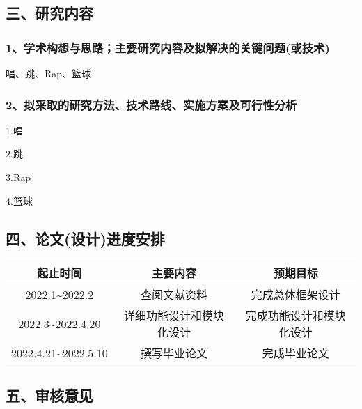 \documentclass[UTF8,zihao=-4]{oucart}
\begin{document}
\subsection*{三、研究内容}

\begin{framed}


\subsubsection*{1、学术构想与思路；主要研究内容及拟解决的关键问题(或技术)}

唱、跳、Rap、篮球

\subsubsection*{2、拟采取的研究方法、技术路线、实施方案及可行性分析}

1.唱

2.跳

3.Rap

4.篮球
\end{framed}

\newpage

\subsection*{四、论文(设计)进度安排}

\noindent
\begin{tabular}{|c|c|c|}
	\hline
	起止时间 & 主要内容 & 预期目标 \\
	\hline
	2022.1\~{}2022.2	 		&  查阅文献资料    			&  完成总体框架设计    \\
	\hline
	2022.3\~{}2022.4.20	 	&  详细功能设计和模块化设计   	&  完成功能设计和模块化设计    \\
	\hline
	2022.4.21\~{}2022.5.10	 	&  撰写毕业论文    			& 完成毕业论文 \\
	\hline
\end{tabular}

\subsection*{五、审核意见}

\begin{framed}
	\vspace{50mm}
    \begin{flushright}
		\makebox[35mm]{}\par
		\makebox[10mm]{}\makebox[10mm]{}\makebox[10mm]{}\makebox[10mm]{}\par
	\end{flushright}
\end{framed}
\end{document}
